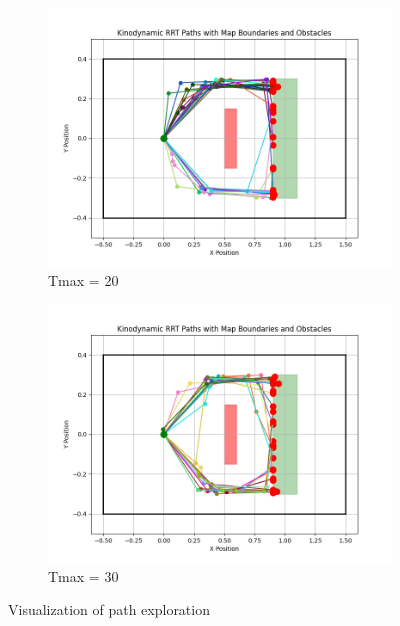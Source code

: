 \documentclass[12pt]{article}
\begin{document}
\begin{figure}[h!]
    \vspace{0.5cm} %

    \begin{subfigure}{0.45\textwidth}
        \centering
        \includegraphics[width=\textwidth]{./images/20.png}
        \caption{Tmax = 20}
        \label{fig:20.png}
    \end{subfigure}
    \hfill
    \begin{subfigure}{0.45\textwidth}
        \centering
        \includegraphics[width=\textwidth]{./images/30.png}
        \caption{Tmax = 30}
        \label{fig:30.png}
    \end{subfigure}

    \caption{Visualization of path exploration}
    \label{fig:Time Trails}
\end{figure}
\end{document}
